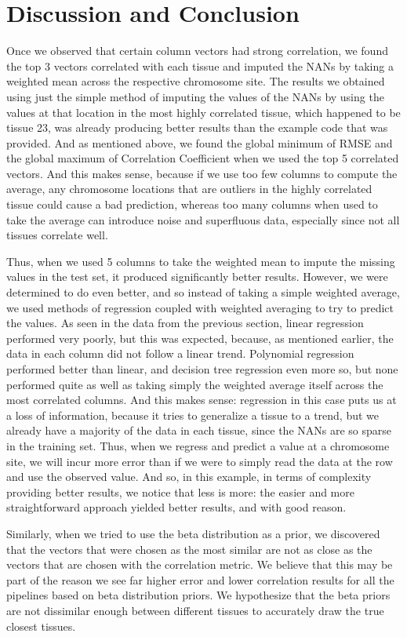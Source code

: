 \documentclass{article} %
\begin{document}
\section{Discussion and Conclusion}
Once we observed that certain column vectors had strong correlation, we found the top 3 vectors correlated with each tissue and imputed the NANs by taking a weighted mean across the respective chromosome site. The results we obtained using just the simple method of imputing the values of the NANs by using the values at that location in the most highly correlated tissue, which happened to be tissue 23, was already producing better results than the example code that was provided. And as mentioned above, we found the global minimum of RMSE and the global maximum of Correlation Coefficient when we used the top 5 correlated vectors. And this makes sense, because if we use too few columns to compute the average, any chromosome locations that are outliers in the highly correlated tissue could cause a bad prediction, whereas too many columns when used to take the average can introduce noise and superfluous data, especially since not all tissues correlate well.

Thus, when we used 5 columns to take the weighted mean to impute the missing values in the test set, it produced significantly better results. However, we were determined to do even better, and so instead of taking a simple weighted average, we used methods of regression coupled with weighted averaging to try to predict the values. As seen in the data from the previous section, linear regression performed very poorly, but this was expected, because, as mentioned earlier, the data in each column did not follow a linear trend. Polynomial regression performed better than linear, and decision tree regression even more so, but none performed quite as well as taking simply the weighted average itself across the most correlated columns. And this makes sense: regression in this case puts us at a loss of information, because it tries to generalize a tissue to a trend, but we already have a majority of the data in each tissue, since the NANs are so sparse in the training set. Thus, when we regress and predict a value at a chromosome site, we will incur more error than if we were to simply read the data at the row and use the observed value. And so, in this example, in terms of complexity providing better results, we notice that less is more: the easier and more straightforward approach yielded better results, and with good reason.

Similarly, when we tried to use the beta distribution as a prior, we discovered that the vectors that were chosen as the most similar are not as close as the vectors that are chosen with the correlation metric. We believe that this may be part of the reason we see far higher error and lower correlation results for all the pipelines based on beta distribution priors. We hypothesize that the beta priors are not dissimilar enough between different tissues to accurately draw the true closest tissues.
\end{document}
